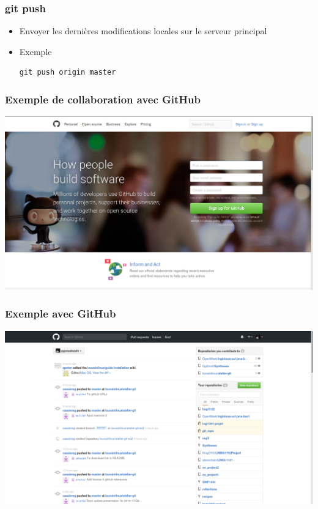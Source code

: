 \documentclass{beamer}
\begin{document}
\begin{frame}[fragile]
\frametitle{git push}

\begin{itemize}
\item Envoyer les dernières modifications locales sur le serveur principal
\item Exemple
\begin{lstlisting}
git push origin master
\end{lstlisting}
\end{itemize}
\end{frame}

\begin{frame}[fragile]
\frametitle{Exemple de collaboration avec GitHub}
  \begin{center}
      \includegraphics[width=\textwidth]{img/github_home}
  \end{center}
\end{frame}

\begin{frame}[fragile]
\frametitle{Exemple avec GitHub}
  \begin{center}
      \includegraphics[width=\textwidth]{img/github_account_home}
  \end{center}
\end{frame}
\end{document}
